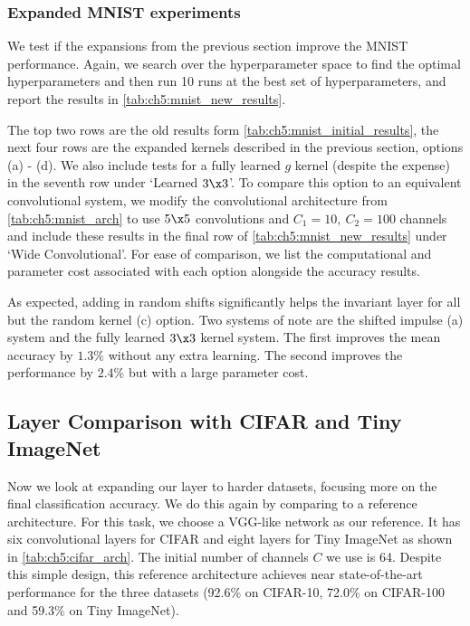 \subsubsection{Expanded MNIST experiments}
We test if the expansions from the previous section improve the MNIST
performance. Again, we search over the hyperparameter space to find the optimal
hyperparameters and then run 10 runs at the best set of hyperparameters, and
report the results in \autoref{tab:ch5:mnist_new_results}. 

The top two rows are the old results form
\autoref{tab:ch5:mnist_initial_results}, the next four rows are the expanded
kernels described in the previous section, options (a) - (d). We also include
tests for a fully learned $g$ kernel (despite the expense) in the seventh row
under `Learned $3\x 3$'. To compare this option to an equivalent convolutional
system, we modify the convolutional architecture from
\autoref{tab:ch5:mnist_arch} to use $5\x 5$ convolutions and $C_1 = 10,\ C_2 =
100$ channels and include these results in the final row of
\autoref{tab:ch5:mnist_new_results} under `Wide Convolutional'. For ease of
comparison, we list the computational and parameter cost associated with each
option alongside the accuracy results.

As expected, adding in random shifts significantly helps the invariant layer for all 
but the random kernel (c) option. Two systems of
note are the shifted impulse (a) system and the fully learned $3\x 3$ kernel
system. The first improves the mean accuracy by $1.3\%$ without any extra
learning. The second improves the performance by $2.4\%$ but with a large
parameter cost. 



\subsection{Layer Comparison with CIFAR and Tiny ImageNet}\label{sec:ch5:conv_exp}

Now we look at expanding our layer to harder datasets, focusing more on the
final classification accuracy. We do this again by comparing to a reference
architecture. For this task, we choose a VGG-like network as our reference.
It has six convolutional layers for CIFAR and eight layers for Tiny ImageNet as shown in
\autoref{tab:ch5:cifar_arch}. The initial number of channels $C$ we use is 64. Despite
this simple design, this reference architecture achieves near state-of-the-art performance
for the three datasets (92.6\% on CIFAR-10, 72.0\% on CIFAR-100 and 59.3\% on
Tiny ImageNet).

